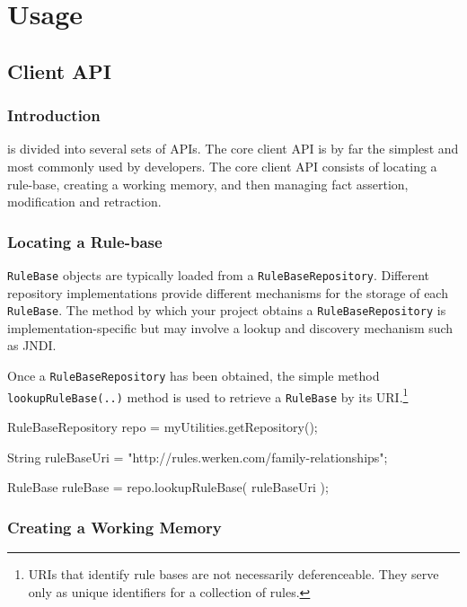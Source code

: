 \chapter{Usage}

\section{\drools{} Client API}

\subsection{Introduction}

\drools{} is divided into several sets of APIs.  The core client API
is by far the simplest and most commonly used by developers.  The
core \drools{} client API consists of locating a rule-base, creating
a working memory, and then managing fact assertion, modification and
retraction.

\subsection{Locating a Rule-base}

\verb|RuleBase| objects are typically loaded from a
\verb|RuleBaseRepository|.  Different repository implementations
provide different mechanisms for the storage of each
\verb|RuleBase|.  The method by which your project obtains
a \verb|RuleBaseRepository| is implementation-specific but
may involve a lookup and discovery mechanism such as JNDI.

Once a \verb|RuleBaseRepository| has been obtained, the
simple method\\ \verb|lookupRuleBase(..)| method is used
to retrieve a \verb|RuleBase| by its URI.\footnote{URIs that
identify rule bases are not necessarily deferenceable.  They
serve only as unique identifiers for a collection of rules.}

\bigskip
\begin{codelisting}
RuleBaseRepository repo = myUtilities.getRepository();

String ruleBaseUri = "http://rules.werken.com/family-relationships";

RuleBase ruleBase = repo.lookupRuleBase( ruleBaseUri );
\end{codelisting}

\newpage

\subsection{Creating a Working Memory}


